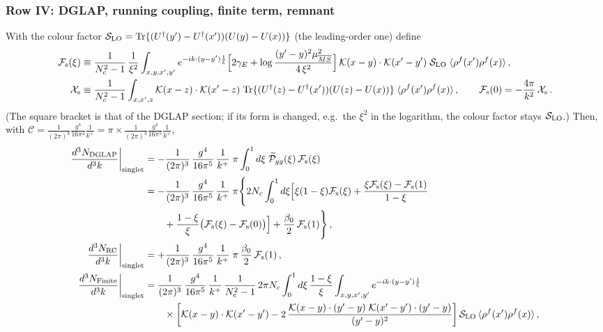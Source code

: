\documentclass[9pt]{article}
\numberwithin{equation}{section}
\begin{document}
{\subsubsection*{Row IV: DGLAP, running coupling, finite term, remnant}
\noindent With the colour factor $\mathcal{S}_{\rm LO}={\rm Tr}\{(U^{\dagger}(y')-U^{\dagger}(x'))(U(y)-U(x))\}$ (the leading-order one) define
\begin{align}
\mathcal{F}_{\rm s}(\xi)&\equiv\frac{1}{N_{c}^{2}-1}\,\frac{1}{\xi^{2}}\int_{x,y,x',y'}e^{-ik\cdot(y-y')\frac{1}{\xi}}\Big[2\gamma_{E}+\log\frac{(y'-y)^{2}\mu^{2}_{\overline{MS}}}{4\,\xi^{2}}\Big]\,\mathcal{K}(x-y)\cdot\mathcal{K}(x'-y')\;\mathcal{S}_{\rm LO}\;\langle\rho^{f}(x')\rho^{f}(x)\rangle\,,\notag\\
\mathcal{X}_{\rm s}&\equiv\frac{1}{N_{c}^{2}-1}\int_{x,x',z}\mathcal{K}(x-z)\cdot\mathcal{K}(x'-z)\;{\rm Tr}\{(U^{\dagger}(z)-U^{\dagger}(x'))(U(z)-U(x))\}\;\langle\rho^{f}(x')\rho^{f}(x)\rangle\,,\qquad\mathcal{F}_{\rm s}(0)=-\frac{4\pi}{k^{2}}\,\mathcal{X}_{\rm s}\,.\notag
\end{align}
(The square bracket is that of the DGLAP section; if its form is changed, e.g.\ the $\xi^{2}$ in the logarithm, the colour factor stays $\mathcal{S}_{\rm LO}$.) Then, with $\mathcal{C}=\frac{1}{(2\pi)^{3}}\frac{g^{4}}{16\pi^{4}}\frac{1}{k^{+}}=\pi\times\frac{1}{(2\pi)^{3}}\frac{g^{4}}{16\pi^{5}}\frac{1}{k^{+}}$,
\begin{align}
\frac{d^{3}N_{\rm DGLAP}}{d^{3}k}\bigg|_{\rm singlet}&=-\frac{1}{(2\pi)^{3}}\,\frac{g^{4}}{16\pi^{5}}\,\frac{1}{k^{+}}\;\pi\int_{0}^{1}d\xi\;\widetilde{\mathcal P}_{gg}(\xi)\,\mathcal{F}_{\rm s}(\xi)\notag\\
&=-\frac{1}{(2\pi)^{3}}\,\frac{g^{4}}{16\pi^{5}}\,\frac{1}{k^{+}}\;\pi\Bigg\{2N_{c}\int_{0}^{1}d\xi\Big[\xi(1-\xi)\mathcal{F}_{\rm s}(\xi)+\frac{\xi\mathcal{F}_{\rm s}(\xi)-\mathcal{F}_{\rm s}(1)}{1-\xi}\notag\\&\qquad+\frac{1-\xi}{\xi}\big(\mathcal{F}_{\rm s}(\xi)-\mathcal{F}_{\rm s}(0)\big)\Big]+\frac{\beta_{0}}{2}\,\mathcal{F}_{\rm s}(1)\Bigg\}\,,\label{eq:s-DGLAP}\\
\frac{d^{3}N_{\rm RC}}{d^{3}k}\bigg|_{\rm singlet}&=+\frac{1}{(2\pi)^{3}}\,\frac{g^{4}}{16\pi^{5}}\,\frac{1}{k^{+}}\;\pi\,\frac{\beta_{0}}{2}\,\mathcal{F}_{\rm s}(1)\,,\label{eq:s-RC}\\
\frac{d^{3}N_{\rm Finite}}{d^{3}k}\bigg|_{\rm singlet}&=\frac{1}{(2\pi)^{3}}\,\frac{g^{4}}{16\pi^{5}}\,\frac{1}{k^{+}}\,\frac{1}{N_{c}^{2}-1}\,2\pi N_{c}\int_{0}^{1}d\xi\,\frac{1-\xi}{\xi}\int_{x,y,x',y'}e^{-ik\cdot(y-y')\frac{1}{\xi}}\notag\\&\qquad\times\bigg[\mathcal{K}(x-y)\cdot\mathcal{K}(x'-y')-2\,\frac{\mathcal{K}(x-y)\cdot(y'-y)\;\mathcal{K}(x'-y')\cdot(y'-y)}{(y'-y)^{2}}\bigg]\,\mathcal{S}_{\rm LO}\,\langle\rho^{f}(x')\rho^{f}(x)\rangle\,,\label{eq:s-fin}\\

\end{align}}
\end{document}
